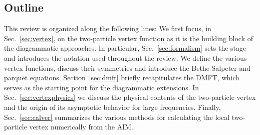 \documentclass[rmp,aps,reprint,amsmath,amssymb,superscriptaddress,showpacs,nofootinbib]{revtex4-1}
\begin{document}
\subsection{Outline}
\label{sec:outline}
This review is organized along the following lines: We first focus, in Sec.~\ref{sec:vertex}, on the two-particle vertex function as it is the building block of the diagrammatic approaches. In particular, Sec.~\ref{sec:formalism} sets the stage and introduces the notation used throughout the review. We define the various vertex functions, discuss their symmetries and introduce the Bethe-Salpeter and parquet equations. Section~\ref{sec:dmft}  briefly recapitulates the DMFT, which serves as the starting point for the diagrammatic extensions. In Sec.~\ref{sec:vertexphysics} we discuss the physical contents of the two-particle vertex and the origin of its asymptotic behavior for large frequencies. Finally, Sec.~\ref{sec:calver} summarizes the various methods for calculating the local two-particle vertex numerically from the AIM.
\end{document}
